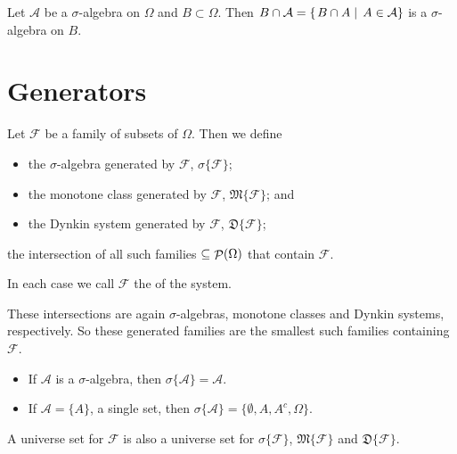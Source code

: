 \begin{lemma}
Let $\mathcal{A}$ be a $\sigma$-algebra on $\Omega$ and $B\subset \Omega$. Then $B\cap \mathcal{A} = \left\{\left. B\cap A \;\right|\; A\in\mathcal{A} \right\}$ is a $\sigma$-algebra on $B$.
\end{lemma}

\section{Generators}
\begin{definition}
Let $\mathcal{F}$ be a family of subsets of $\Omega$. Then we define
\begin{itemize}
\item the $\sigma$-algebra generated by $\mathcal{F}$, $\sigma\{\mathcal{F}\}$;
\item the monotone class generated by $\mathcal{F}$, $\mathfrak{M}\{\mathcal{F}\}$; and
\item the Dynkin system generated by $\mathcal{F}$, $\mathfrak{D}\{\mathcal{F}\}$;
\end{itemize}
the intersection of all such families $\subseteq \mathop{\mathcal{P}}(\Omega)$ that contain $\mathcal{F}$.

In each case we call $\mathcal{F}$ the  of the system.
\end{definition}
These intersections are again $\sigma$-algebras, monotone classes and Dynkin systems, respectively. So these generated families are the smallest such families containing $\mathcal{F}$.

\begin{example}
\begin{itemize}
\item If $\mathcal{A}$ is a $\sigma$-algebra, then $\sigma\{\mathcal{A}\} = \mathcal{A}$.
\item If $\mathcal{A} = \{A\}$, a single set, then $\sigma\{\mathcal{A}\} = \{\emptyset, A,A^c,\Omega\}$.
\end{itemize}
\end{example}

\begin{lemma} \label{unitGeneratedSets}
A universe set for $\mathcal{F}$ is also a universe set for $\sigma\{\mathcal{F}\}$, $\mathfrak{M}\{\mathcal{F}\}$ and $\mathfrak{D}\{\mathcal{F}\}$.
\end{lemma}


